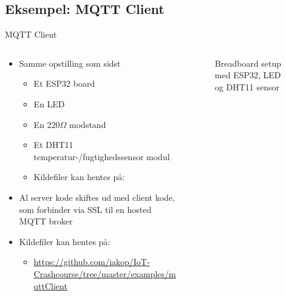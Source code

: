 \documentclass[aspectratio=169]{beamer}
\begin{document}
\subsection{Eksempel: MQTT Client}
\begin{frame}{MQTT Client}
\begin{columns}
	\begin{column}{0.6\textwidth}
		\begin{textBox}
		\begin{itemize}
			\item Samme opstilling som sidst
			\begin{itemize}
				\item Et ESP32 board
				\item En LED
				\item En 220{\textsf{$\Omega$}} modstand
				\item Et DHT11 temperatur-/fugtighedssensor modul
				\item Kildefiler kan hentes på:
			\end{itemize}
			\item Al server kode skiftes ud med client kode, som forbinder via SSL til en hosted MQTT broker
			\item Kildefiler kan hentes på:
			\begin{itemize}
				\item \tiny\url{https://github.com/iakop/IoT-Crashcourse/tree/master/examples/mqttClient}
			\end{itemize}
		\end{itemize}
		\end{textBox}
	\end{column}
	\begin{column}{0.4\textwidth}
		\centering
		\begin{figure}
  			
  			\caption{Breadboard setup med ESP32, LED og DHT11 sensor}
  			\label{fig:esp32-led-dht11-2}
		\end{figure}
	\end{column}
\end{columns}
\end{frame}
\end{document}
